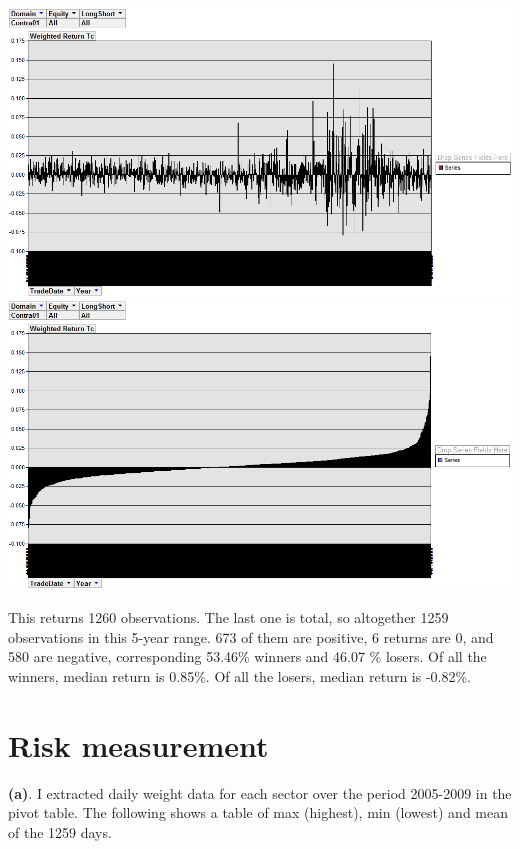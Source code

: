 \documentclass[11pt,letter]{article}
\begin{document}
\begin{center}
\includegraphics[scale=0.5,keepaspectratio]{2d}
\includegraphics[scale=0.5,keepaspectratio]{2d_2}
\end{center}

This returns 1260 observations. The last one is total, so altogether 1259 observations in this 5-year range. 673 of them are positive, 6 returns are 0, and 580 are negative, corresponding 53.46\% winners and 46.07 \% losers. Of all the winners, median return is 0.85\%. Of all the losers, median return is -0.82\%.

\section{Risk measurement}

\textbf{(a)}. I extracted daily weight data for each sector over the period 2005-2009 in the pivot table. The following shows a table of max (highest), min (lowest) and mean of the 1259 days.
\end{document}
